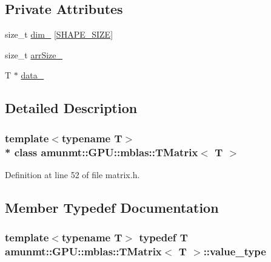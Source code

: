 \subsection*{Private Attributes}
\begin{DoxyCompactItemize}
\item 
size\+\_\+t \hyperlink{classamunmt_1_1GPU_1_1mblas_1_1TMatrix_ad9811151546f114cf3f55c80f384087e}{dim\+\_\+} \mbox{[}\hyperlink{namespaceamunmt_a0c4d3d7c0b1b52dbe7a658b3dc026409}{S\+H\+A\+P\+E\+\_\+\+S\+I\+ZE}\mbox{]}
\item 
size\+\_\+t \hyperlink{classamunmt_1_1GPU_1_1mblas_1_1TMatrix_ae5fabb47536114e44975883ccf2d9c89}{arr\+Size\+\_\+}
\item 
T $\ast$ \hyperlink{classamunmt_1_1GPU_1_1mblas_1_1TMatrix_a277cd179551a588798f9c4e3269fb47a}{data\+\_\+}
\end{DoxyCompactItemize}


\subsection{Detailed Description}
\subsubsection*{template$<$typename T$>$\\*
class amunmt\+::\+G\+P\+U\+::mblas\+::\+T\+Matrix$<$ T $>$}



Definition at line 52 of file matrix.\+h.



\subsection{Member Typedef Documentation}
\subsubsection[{\texorpdfstring{value\+\_\+type}{value_type}}]{\setlength{\rightskip}{0pt plus 5cm}template$<$typename T$>$ typedef T {\bf amunmt\+::\+G\+P\+U\+::mblas\+::\+T\+Matrix}$<$ T $>$\+::{\bf value\+\_\+type}}\hypertarget{classamunmt_1_1GPU_1_1mblas_1_1TMatrix_afcab21668823619cd9578fea0cebd8df}{}\label{classamunmt_1_1GPU_1_1mblas_1_1TMatrix_afcab21668823619cd9578fea0cebd8df}


